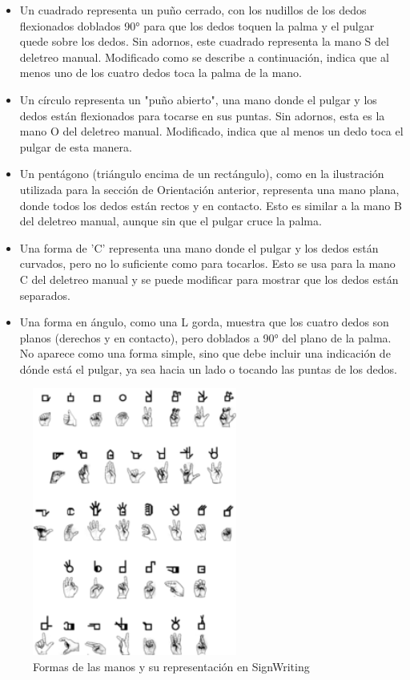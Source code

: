 \begin{itemize}

    \item Un cuadrado representa un puño cerrado, con los nudillos de los dedos flexionados doblados 90° para que los dedos toquen la palma y el pulgar quede sobre los dedos. Sin adornos, este cuadrado representa la mano S del deletreo manual. Modificado como se describe a continuación, indica que al menos uno de los cuatro dedos toca la palma de la mano.
    \item Un círculo representa un "puño abierto", una mano donde el pulgar y los dedos están flexionados para tocarse en sus puntas. Sin adornos, esta es la mano O del deletreo manual. Modificado, indica que al menos un dedo toca el pulgar de esta manera.
    \item Un pentágono (triángulo encima de un rectángulo), como en la ilustración utilizada para la sección de Orientación anterior, representa una mano plana, donde todos los dedos están rectos y en contacto. Esto es similar a la mano B del deletreo manual, aunque sin que el pulgar cruce la palma.
    \item Una forma de 'C' representa una mano donde el pulgar y los dedos están curvados, pero no lo suficiente como para tocarlos. Esto se usa para la mano C del deletreo manual y se puede modificar para mostrar que los dedos están separados.
    \item Una forma en ángulo, como una L gorda, muestra que los cuatro dedos son planos (derechos y en contacto), pero doblados a 90° del plano de la palma. No aparece como una forma simple, sino que debe incluir una indicación de dónde está el pulgar, ya sea hacia un lado o tocando las puntas de los dedos.

\end{itemize}

\begin{figure}[ht!]
    \centering
    \includegraphics[width=0.6\textwidth]{Graphics/suttonhandshape.png}
    \caption{Formas de las manos y su representación en SignWriting}
    \label{fig:handshape}
\end{figure}

